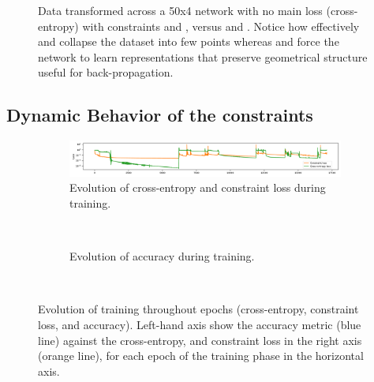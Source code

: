 \begin{figure}[h!]
  \caption{Data transformed across a 50x4 network with no main loss (cross-entropy) with constraints \SepLayer and \SepUnitPoint, versus \ReLU and \ReLUBN. Notice how effectively \ReLU and \ReLUBN collapse the dataset into few points whereas \SepLayer and \SepUnitPoint force the network to learn representations that preserve geometrical structure useful for back-propagation.} 
  \label{fig:init} 
\end{figure}

\subsection{Dynamic Behavior of the constraints}\label{subsec:dynamicBehavior}
\begin{figure}[h!]
    \begin{subfigure}[c]{1\textwidth}
        \centering
        \includegraphics[width=1\textwidth]{img/convergence/peaks_loss.pdf}
        \caption{Evolution of cross-entropy and constraint loss during training.}
        \label{fig:loss_convergence}
    \end{subfigure}
    \\
    \begin{subfigure}[c]{1\textwidth}
        \centering
        \caption{Evolution of accuracy during training.}
        \label{fig:accuracy_convergence}
    \end{subfigure}
    \\
     
      \caption{Evolution of training throughout epochs (cross-entropy, constraint loss, and accuracy). Left-hand axis show the accuracy metric (blue line) against the cross-entropy, and constraint loss in the right axis (orange line), for each epoch of the training phase in the horizontal axis.}
	\label{fig:peaks}
\end{figure}
